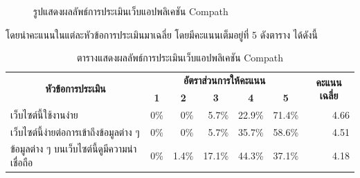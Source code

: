 \begin{enumerate}
\begin{figure}[H]
            \caption{รูปแสดงผลลัพธ์การประเมินเว็บแอปพลิเคชัน Compath}\label{fig:QuantitativeResult}
        \end{figure}
        โดยนำคะแนนในแต่ละหัวข้อการประเมินมาเฉลี่ย โดยมีคะแนนเต็มอยู่ที่ 5 ดังตาราง ได้ดังนี้
        \begin{table}[H]
            \caption{ตารางแสดงผลลัพธ์การประเมินเว็บแอปพลิเคชัน Compath}
            \label{tab:QuantitativeResult}
            \begin{tabular}{|l|rrrrr|r|}
            \hline
            \multicolumn{1}{|c|}{\multirow{2}{*}{\textbf{หัวข้อการประเมิน}}}                                                          & \multicolumn{5}{c|}{\textbf{อัตราส่วนการให้คะแนน}}                                                                                                                      & \multicolumn{1}{c|}{\multirow{2}{*}{\textbf{คะแนนเฉลี่ย}}} \\ \cline{2-6}
            \multicolumn{1}{|c|}{}                                                                                                    & \multicolumn{1}{c|}{\textbf{1}} & \multicolumn{1}{c|}{\textbf{2}} & \multicolumn{1}{c|}{\textbf{3}} & \multicolumn{1}{c|}{\textbf{4}} & \multicolumn{1}{c|}{\textbf{5}} & \multicolumn{1}{c|}{}                                      \\ \hline
            เว็บไซต์นี้ใช้งานง่าย                                                                                                     & \multicolumn{1}{r|}{0\%}          & \multicolumn{1}{r|}{0\%}          & \multicolumn{1}{r|}{5.7\%}        & \multicolumn{1}{r|}{22.9\%}       & 71.4\%                            & 4.66                                                       \\ \hline
            เว็บไซต์นี้ง่ายต่อการเข้าถึงข้อมูลต่าง ๆ                                                                                  & \multicolumn{1}{r|}{0\%}          & \multicolumn{1}{r|}{0\%}          & \multicolumn{1}{r|}{5.7\%}        & \multicolumn{1}{r|}{35.7\%}       & 58.6\%                            & 4.51                                                       \\ \hline
            ข้อมูลต่าง ๆ บนเว็บไซต์นี้ดูมีความน่าเชื่อถือ                                                                             & \multicolumn{1}{r|}{0\%}          & \multicolumn{1}{r|}{1.4\%}        & \multicolumn{1}{r|}{17.1\%}       & \multicolumn{1}{r|}{44.3\%}       & 37.1\%                            & 4.18                                                       \\ \hline

\end{tabular}
\end{table}
\end{enumerate}
